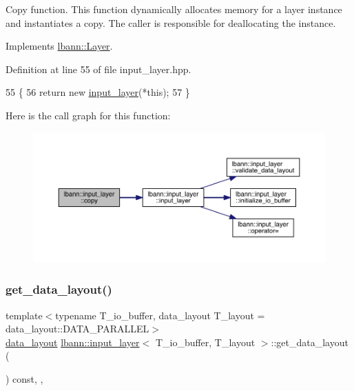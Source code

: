 Copy function. This function dynamically allocates memory for a layer instance and instantiates a copy. The caller is responsible for deallocating the instance. 

Implements \hyperlink{classlbann_1_1Layer_af420f22bbac801c85483ade84588a23f}{lbann\+::\+Layer}.



Definition at line 55 of file input\+\_\+layer.\+hpp.


\begin{DoxyCode}
55                                      \{
56     \textcolor{keywordflow}{return} \textcolor{keyword}{new} \hyperlink{classlbann_1_1input__layer_aad8b042899d86f5b7904d9d2653b5181}{input\_layer}(*\textcolor{keyword}{this});
57   \}
\end{DoxyCode}
Here is the call graph for this function\+:\nopagebreak
\begin{figure}[H]
\begin{center}
\leavevmode
\includegraphics[width=350pt]{classlbann_1_1input__layer_a02eb5e9b97c1da48997995cb89d297ec_cgraph}
\end{center}
\end{figure}
\mbox{\label{classlbann_1_1input__layer_ae8556702a6c04aeeec8d5eea2d0e90e6}} 
\subsubsection{\texorpdfstring{get\+\_\+data\+\_\+layout()}{get\_data\_layout()}}
{\footnotesize\ttfamily template$<$typename T\+\_\+io\+\_\+buffer, data\+\_\+layout T\+\_\+layout = data\+\_\+layout\+::\+D\+A\+T\+A\+\_\+\+P\+A\+R\+A\+L\+L\+EL$>$ \\
\hyperlink{base_8hpp_a786677cbfb3f5677b4d84f3056eb08db}{data\+\_\+layout} \hyperlink{classlbann_1_1input__layer}{lbann\+::input\+\_\+layer}$<$ T\+\_\+io\+\_\+buffer, T\+\_\+layout $>$\+::get\+\_\+data\+\_\+layout (\begin{DoxyParamCaption}{ }\end{DoxyParamCaption}) const\hspace{0.3cm}{\ttfamily [inline]}, {\ttfamily [override]}, {\ttfamily [virtual]}}

